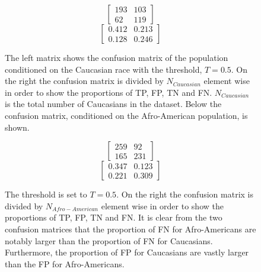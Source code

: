 \documentclass[11pt, fleqn, titlepage]{article}
\begin{document}
	\begin{figure}[h]	
	\begin{multicols}{2}
		\begin{ceqn}
		\begin{equation*}
		\begin{bmatrix}
		193 & 103  \\
		62 & 119 
		\end{bmatrix} 
		\end{equation*} 
		\begin{equation*}
		\begin{bmatrix}
		0.412 & 0.213  \\
		0.128 & 0.246 
		\end{bmatrix} 
		\end{equation*}
		\end{ceqn}
	\end{multicols}
	{The left matrix shows the confusion matrix of the population conditioned on the Caucasian race with the threshold, $ T = 0.5 $. On the right the confusion matrix is divided by $ N_{Caucasian} $ element wise in order to show the proportions of TP, FP, TN and FN. $ N_{Caucasian} $ is the total number of Caucasians in the dataset. Below the confusion matrix, conditioned on the Afro-American population, is shown.}
	\end{figure}
	\begin{figure}[h]	
		\begin{multicols}{2}
			\begin{ceqn}
			\begin{equation*}
			\begin{bmatrix}
			259 & 92  \\
			165 & 231 
			\end{bmatrix} 
			\end{equation*} 
			\begin{equation*}
			\begin{bmatrix}
			0.347 & 0.123 \\
			0.221 & 0.309 
			\end{bmatrix} 
			\end{equation*}
			\end{ceqn}
		\end{multicols}
		{The threshold is set to $ T = 0.5 $. On the right the confusion matrix is divided by $ N_{Afro-American} $ element wise in order to show the proportions of TP, FP, TN and FN. It is clear from the two confusion matrices that the proportion of FN for Afro-Americans are notably larger than the proportion of FN for Caucasians. Furthermore, the proportion of FP for Caucasians are vastly larger than the FP for Afro-Americans.}
	\end{figure}
\end{document}
